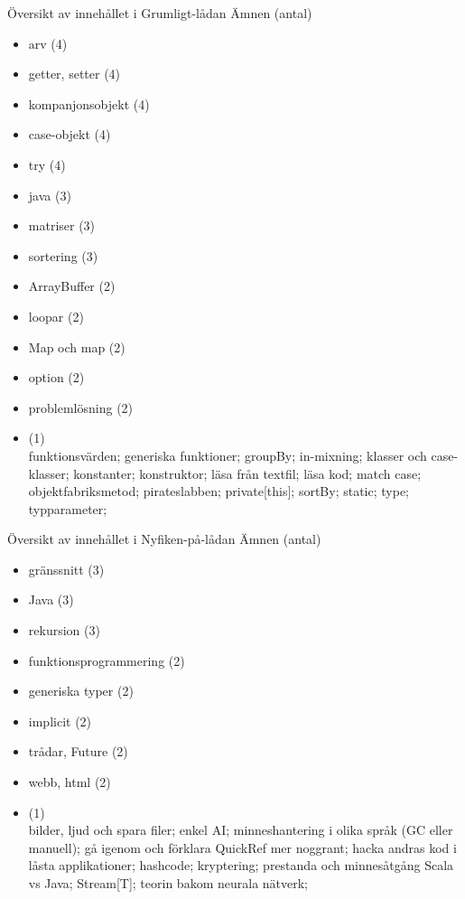 

\ifkompendium\else

\begin{Slide}{Översikt av innehållet i Grumligt-lådan}\SlideFontSmall
Ämnen (antal)
\begin{multicols}{2}
\begin{itemize}\SlideFontTiny
\item arv (4)
\item getter, setter (4)
\item kompanjonsobjekt (4)
\item case-objekt (4)
\item try (4)
\item java (3)
\item matriser (3)
\item sortering (3)
\item ArrayBuffer (2)
\item loopar (2)
\item Map och map (2)
\item option (2)
\item problemlösning (2)
\item (1) \\
funktionsvärden; 
generiska funktioner;
groupBy;
in-mixning;
klasser och case-klasser;
konstanter;
konstruktor;
läsa från textfil;
läsa kod;
match case;
objektfabriksmetod;
pirateslabben;
private[this];
sortBy;
static;
type;
typparameter;

\end{itemize}
\end{multicols}
\end{Slide}

\begin{Slide}{Översikt av innehållet i Nyfiken-på-lådan}\SlideFontSmall
Ämnen (antal)
\begin{multicols}{2}
\begin{itemize}\SlideFontTiny
\item gränssnitt (3)
\item Java (3)
\item rekursion (3)
\item funktionsprogrammering (2)
\item generiska typer (2)
\item implicit (2)
\item trådar, Future (2)
\item webb, html (2)
\item (1) \\
bilder, ljud och spara filer; 
enkel AI; 
minneshantering i olika språk (GC eller manuell);
gå igenom och förklara QuickRef mer noggrant;
hacka andras kod i låsta applikationer;
hashcode;
kryptering;
prestanda och minnesåtgång Scala vs Java;
Stream[T];
teorin bakom neurala nätverk;
\end{itemize}
\end{multicols}
\end{Slide}


\fi










